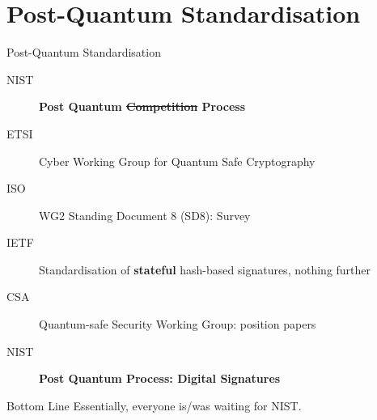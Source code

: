 \documentclass[xcolor=table,10pt,aspectratio=169]{beamer}
\begin{document}
\section{Post-Quantum Standardisation}
\label{sec:org5607675}
\begin{frame}[label={sec:org9504c8a}]{Post-Quantum Standardisation}
\begin{description}
\item[{NIST}] \textbf{Post Quantum \sout{Competition} Process}
\item[{ETSI}] Cyber Working Group for Quantum Safe Cryptography
\item[{ISO}] WG2 Standing Document 8 (SD8): Survey
\item[{IETF}] Standardisation of \textbf{stateful} hash-based signatures, nothing further
\item[{CSA}] Quantum-safe Security Working Group: position papers
\item[{NIST}] \textbf{Post Quantum Process: Digital Signatures}
\end{description}

\pause

\begin{alertblock}{Bottom Line}
Essentially, everyone is/was waiting for NIST.
\end{alertblock}

\vspace{0.7em}
\end{frame}
\end{document}
